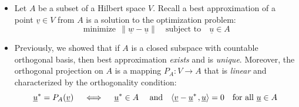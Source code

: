 \documentclass[11pt,twoside]{report}
\newcommand{\bbR}{{\mathbb{R}}}
\newcommand{\vecnot}{\underline}
\DeclareMathOperator*{\minimize}{minimize}
\newcommand{\inner}[2]{{\left\langle #1 \mskip2mu , #2 \right\rangle}}
\begin{document}
\begin{itemize}
\begin{itemize}
\item The intersection of convex sets is convex (but the union of convex sets is not convex in general) %

\item The set of all functions $f \colon V \to \bbR$ whose range is contained in the interval $[a, b]$. i.e., 
\[
a \le   f(\vecnot{x})  \le b  \quad \forall \vecnot{x} \in V
\]

\item The set of $n \times n$ positive semidefinite matrices. [In fact this set is closed under linear combinations with \emph{positive} coefficients] 


\item The empty set is convex since the `for all'' qualifier over the empty set is trivially true. 
\end{itemize}




\item Let $A$ be a subset of a Hilbert space $V$. Recall  a  best approximation of a point $\vecnot{v} \in V$ from $A$ is a solution to the optimization problem: 
\[
\minimize \, \| \vecnot{w} - \vecnot{u} \| \quad \text{subject to} \quad \vecnot{u} \in A
\]
\item Previously, we showed that if $A$ is a closed subspace with countable orthogonal basis, then best approximation \emph{exists} and is \emph{unique}. Moreover, the orthogonal projection on $A$ is a mapping $P_A \colon V \to A$ that is \emph{linear} and characterized by the orthogonality condition: 
\[
\vecnot{u}^* = P_A (\vecnot{v}) \quad \iff \quad  \vecnot{u}^* \in A \quad \text{ and} \quad  \inner{ \vecnot{v}-\vecnot{u}^* }{ \vecnot{u} } = 0 \quad \text{for all $\vecnot{u}\in A$}
\]




\end{itemize}
\end{document}
